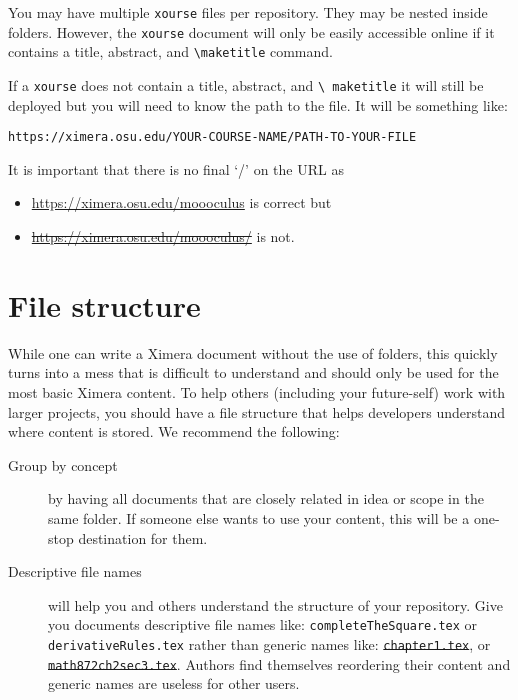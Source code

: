 \documentclass{ximera}
\begin{document}
You may have multiple \verb!xourse! files per repository. They may be nested inside folders. 
  However, the \verb!xourse! document will only be easily accessible online if it
  contains a title,
  abstract, and {\tt\textbackslash maketitle} command.

  If a \verb!xourse! does not contain a title, abstract, and {\tt\textbackslash
      maketitle} it will still be deployed but you will need to know the path
  to the
  file. It will be something like:
  \begin{center}
    \tt https://ximera.osu.edu/YOUR-COURSE-NAME/PATH-TO-YOUR-FILE
  \end{center}
  It is important that there is no final `/' on the URL as
  \begin{itemize}
    \item \url{https://ximera.osu.edu/moooculus} is correct but
    \item \sout{\url{https://ximera.osu.edu/moooculus/}} is not.
  \end{itemize}








\section{File structure}

While one can write a Ximera document without the use of folders, this quickly
turns into a mess that is difficult to understand and should only be used for
the most basic Ximera content.
To help others (including your future-self) work with larger projects, you
should have a file structure
that helps developers understand where content is stored. We recommend the
following:
\begin{description}
  \item[Group by concept] by having all documents that are closely related in
    idea
    or scope in the same folder. If someone else wants to use your content,
    this will be a one-stop destination for them.
  \item[Descriptive file names] will help you and others understand the
    structure of your repository. Give you documents descriptive file names
    like:
    \verb!completeTheSquare.tex! or \verb!derivativeRules.tex! rather than
    generic
    names like: \sout{\texttt{chapter1.tex}}, or
    \sout{\texttt{math872ch2sec3.tex}}. Authors find themselves reordering
    their content and generic names are useless for other users.
\end{description}
\end{document}
